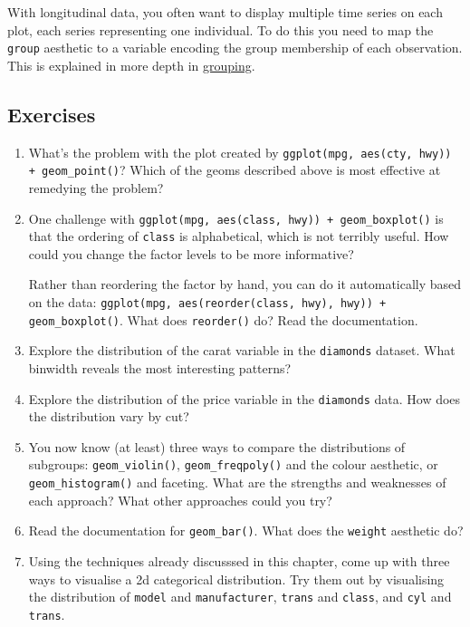 With longitudinal data, you often want to display multiple time series
on each plot, each series representing one individual. To do this you
need to map the \texttt{group} aesthetic to a variable encoding the
group membership of each observation. This is explained in more depth in
\hyperref[sec:grouping]{grouping}.

\subsection{Exercises}

\begin{enumerate}
\def\labelenumi{\arabic{enumi}.}
\item
  What's the problem with the plot created by
  \texttt{ggplot(mpg, aes(cty, hwy)) + geom\_point()}? Which of the
  geoms described above is most effective at remedying the problem?
\item
  One challenge with
  \texttt{ggplot(mpg, aes(class, hwy)) + geom\_boxplot()} is that the
  ordering of \texttt{class} is alphabetical, which is not terribly
  useful. How could you change the factor levels to be more informative?

  Rather than reordering the factor by hand, you can do it automatically
  based on the data:
  \texttt{ggplot(mpg, aes(reorder(class, hwy), hwy)) + geom\_boxplot()}.
  What does \texttt{reorder()} do? Read the documentation.
\item
  Explore the distribution of the carat variable in the
  \texttt{diamonds} dataset. What binwidth reveals the most interesting
  patterns?
\item
  Explore the distribution of the price variable in the
  \texttt{diamonds} data. How does the distribution vary by cut?
\item
  You now know (at least) three ways to compare the distributions of
  subgroups: \texttt{geom\_violin()}, \texttt{geom\_freqpoly()} and the
  colour aesthetic, or \texttt{geom\_histogram()} and faceting. What are
  the strengths and weaknesses of each approach? What other approaches
  could you try?
\item
  Read the documentation for \texttt{geom\_bar()}. What does the
  \texttt{weight} aesthetic do?
\item
  Using the techniques already discusssed in this chapter, come up with
  three ways to visualise a 2d categorical distribution. Try them out by
  visualising the distribution of \texttt{model} and
  \texttt{manufacturer}, \texttt{trans} and \texttt{class}, and
  \texttt{cyl} and \texttt{trans}.
\end{enumerate}

